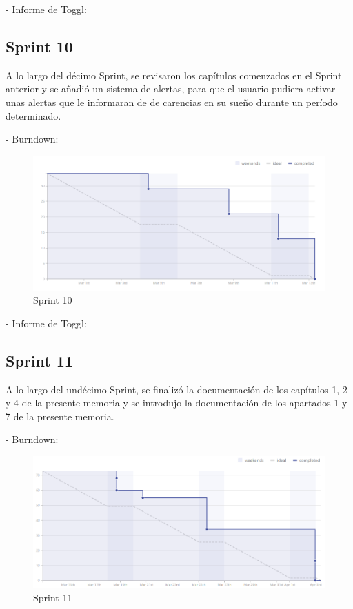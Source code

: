 \documentclass[11pt,openany]{book}
\begin{document}
- Informe de Toggl:



\subsection{Sprint 10}

A lo largo del décimo Sprint, se revisaron los capítulos comenzados en el Sprint anterior y se añadió un sistema de alertas, para que el usuario pudiera activar unas alertas que le informaran de de carencias en su sueño durante un período determinado.

- Burndown:

\begin{figure}[H]
\centering
\includegraphics[totalheight=7cm]{burndowns/Sprint10.png}
\caption{Sprint 10}
\end{figure}

- Informe de Toggl:



\subsection{Sprint 11}

A lo largo del undécimo Sprint, se finalizó la documentación de los capítulos 1, 2 y 4 de la presente memoria y se introdujo la documentación de los apartados 1 y 7 de la presente memoria.

- Burndown:

\begin{figure}[H]
\centering
\includegraphics[totalheight=7cm]{burndowns/Sprint11.png}
\caption{Sprint 11}
\end{figure}
\end{document}
